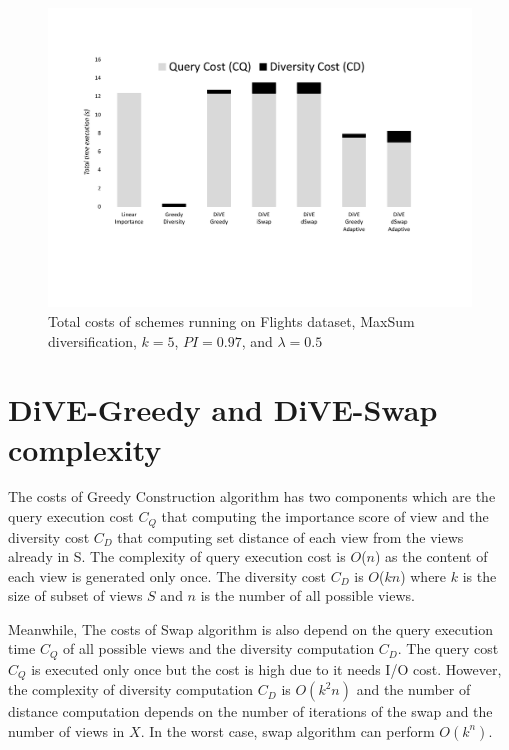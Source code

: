 \documentclass{article}
\begin{document}
\begin{figure}
	\begin{center}
		\vspace{-50pt}
		\includegraphics[width=7.0in]{figures/flight_costs_all}
		\vspace{-90pt}
		\caption{Total costs of schemes running on Flights dataset, MaxSum diversification, $k = 5$,  $ PI = 0.97 $, and $\lambda = 0.5$ }
		\label{fig:flight_costs_all}
		\vspace{-20pt}
	\end{center}
\end{figure}

\section{DiVE-Greedy and DiVE-Swap complexity}
The costs of Greedy Construction algorithm has two components which are the query execution cost $C_Q$ that computing the importance score of view and the diversity cost $C_D$ that computing set distance of each view from the views already in S. The complexity of query execution cost is $ O$($n$) as the content of each view is generated only once. The diversity cost $C_D$ is $ O$($kn$) where $k$ is the size of subset of views $ S $ and $ n $ is the number of all possible views.


Meanwhile, The costs of Swap algorithm is also depend on the query execution time $C_Q$ of all possible views and the diversity computation $C_D$. The query cost $C_Q$ is executed only once but the cost is high due to it needs I/O cost. However, the complexity of diversity computation $C_D$ is $ O\left(k^2n \right) $ and the number of distance computation depends on the number of iterations of the swap and the number of views in $X$. In the worst case, swap algorithm can perform $ O\left(k^n \right) $. 
\end{document}
